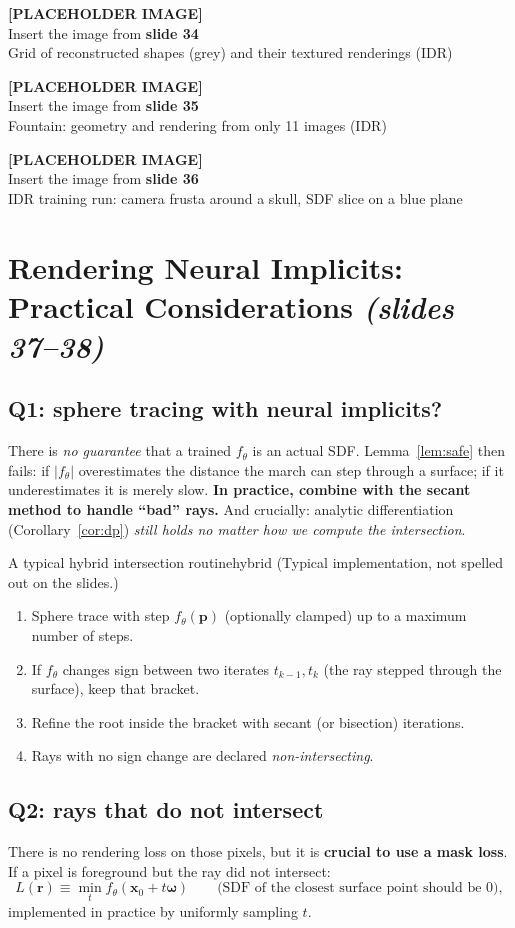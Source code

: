 \documentclass[11pt,a4paper]{article}
\newcommand{\bx}{{\bm{x}}}
\newcommand{\bp}{{\bm{p}}}
\newcommand{\bom}{{\bm{\omega}}}
\newcommand{\br}{{\bm{r}}}
\newcommand{\slideimg}[2]{%
  \begin{center}
  \begin{tcolorbox}[enhanced,colback=gray!8,colframe=gray!8,width=0.92\linewidth,
    halign=center,valign=center,height=3.4cm,
    overlay={\draw[dashed,gray!70,thick] (frame.south west) rectangle (frame.north east);}]
  \textbf{[PLACEHOLDER IMAGE]}\\ Insert the image from \textbf{#1}\\ {\small #2}
  \end{tcolorbox}
  \end{center}}
\begin{document}
\slideimg{slide 34}{Grid of reconstructed shapes (grey) and their textured renderings (IDR)}
\slideimg{slide 35}{Fountain: geometry and rendering from only 11 images (IDR)}
\slideimg{slide 36}{IDR training run: camera frusta around a skull, SDF slice on a blue plane}

\section{Rendering Neural Implicits: Practical Considerations \emph{(slides 37--38)}}
\subsection*{Q1: sphere tracing with neural implicits?}
There is \emph{no guarantee} that a trained $f_\theta$ is an actual SDF. Lemma~\ref{lem:safe} then fails: if $|f_\theta|$
overestimates the distance the march can step through a surface; if it underestimates it is merely slow.
\textbf{In practice, combine with the secant method to handle ``bad'' rays.}
And crucially: analytic differentiation (Corollary~\ref{cor:dp}) \emph{still holds no matter how we compute the intersection}.

\begin{Algorithm}{A typical hybrid intersection routine}{hybrid}
(Typical implementation, not spelled out on the slides.)
\begin{enumerate}[nosep]
\item Sphere trace with step $f_\theta(\bp)$ (optionally clamped) up to a maximum number of steps.
\item If $f_\theta$ changes sign between two iterates $t_{k-1},t_k$ (the ray stepped through the surface), keep that bracket.
\item Refine the root inside the bracket with secant (or bisection) iterations.
\item Rays with no sign change are declared \emph{non-intersecting}.
\end{enumerate}
\end{Algorithm}

\subsection*{Q2: rays that do not intersect}
There is no rendering loss on those pixels, but it is \textbf{crucial to use a mask loss}. If a pixel is foreground but
the ray did not intersect:
\[
L(\br)\equiv\min_t f_\theta(\bx_0+t\bom)\qquad\text{(SDF of the closest surface point should be $0$)},
\]
implemented in practice by uniformly sampling $t$.
\end{document}
